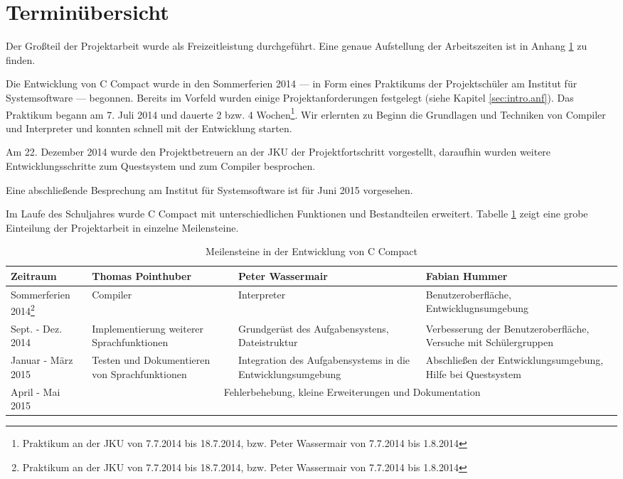 \section{Terminübersicht}

Der Großteil der Projektarbeit wurde als Freizeitleistung durchgeführt. Eine genaue Aufstellung der Arbeitszeiten ist in Anhang \ref{} zu finden.

Die Entwicklung von C Compact wurde in den Sommerferien 2014 --- in Form eines Praktikums der Projektschüler am Institut für Systemsoftware --- begonnen. Bereits im Vorfeld wurden einige Projektanforderungen festgelegt (siehe Kapitel \ref{sec:intro.anf}). Das Praktikum begann am 7. Juli 2014 und dauerte 2 bzw. 4 Wochen\footnote{Praktikum an der JKU von 7.7.2014 bis 18.7.2014, bzw. Peter Wassermair von 7.7.2014 bis 1.8.2014}. Wir erlernten zu Beginn die Grundlagen und Techniken von Compiler und Interpreter und konnten schnell mit der Entwicklung starten.

Am 22. Dezember 2014 wurde den Projektbetreuern an der JKU der Projektfortschritt vorgestellt, daraufhin wurden weitere Entwicklungsschritte zum Questsystem und zum Compiler besprochen.

Eine abschließende Besprechung am Institut für Systemsoftware ist für Juni 2015 vorgesehen.

Im Laufe des Schuljahres wurde C Compact mit unterschiedlichen Funktionen und Bestandteilen erweitert. Tabelle \ref{tab:intro-milestones} zeigt eine grobe Einteilung der Projektarbeit in einzelne Meilensteine.

\begin{table}[h!]
\def\arraystretch{1.6}
\begin{tabularx}{\columnwidth}{|l|XXX|}
\hline
  \textbf{Zeitraum}&\textbf{Thomas Pointhuber}&\textbf{Peter Wassermair}&\textbf{Fabian Hummer}\\
  \hline
  Sommerferien 2014\footnote{Praktikum an der JKU von 7.7.2014 bis 18.7.2014, bzw. Peter Wassermair von 7.7.2014 bis 1.8.2014} & Compiler & Interpreter & Benutzeroberfläche, Entwicklugnsumgebung \\
  Sept. - Dez. 2014 & Implementierung weiterer Sprachfunktionen & Grundgerüst des Aufgabensystens, Dateistruktur & Verbesserung der Benutzeroberfläche, Versuche mit Schülergruppen \\
  Januar - März 2015 & Testen und Dokumentieren von Sprachfunktionen & Integration des Aufgabensystems in die Entwicklungsumgebung & Abschließen der Entwicklungsumgebung, Hilfe bei Questsystem\\
  April - Mai 2015 & \multicolumn{3}{c}{Fehlerbehebung, kleine Erweiterungen und Dokumentation}\\
  \hline
\end{tabularx}
\caption{Meilensteine in der Entwicklung von C Compact}
\label{tab:intro-milestones}
\end{table}


